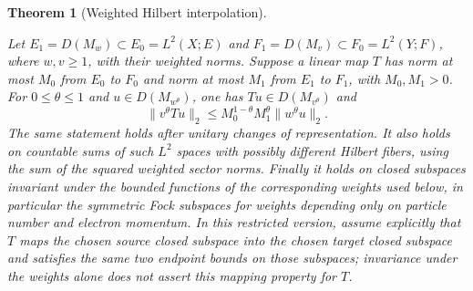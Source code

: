 \documentclass[11pt,a4paper]{article}
\newtheorem{theorem}{Theorem}[section]
\theoremstyle{definition}
\theoremstyle{remark}
\newcommand{\proofid}[1]{\par\smallskip{\normalfont\scriptsize\color{inkblue}Stable ID: \nolinkurl{#1}}\par\smallskip}
\begin{document}
\begin{theorem}[Weighted Hilbert interpolation]
\label{basic:interpolation}
\proofid{basic:interpolation}
\par{}\par\smallskip
\label{basic:weighted_interpolation}
Let $E_1=D(M_w)\subset E_0=L^2(X;E)$ and
$F_1=D(M_v)\subset F_0=L^2(Y;F)$, where $w,v\geq1$, with their weighted
norms. Suppose a linear map $T$ has norm at most $M_0$ from $E_0$ to
$F_0$ and norm at most $M_1$ from $E_1$ to $F_1$, with $M_0,M_1>0$.
For $0\leq\theta\leq1$ and $u\in D(M_{w^\theta})$, one has
$Tu\in D(M_{v^\theta})$ and
\[
 \|v^\theta Tu\|_2\leq M_0^{1-\theta}M_1^\theta\|w^\theta u\|_2.
\]
The same statement holds after unitary changes of representation.
It also holds on countable sums of such $L^2$ spaces with possibly
different Hilbert fibers, using the sum of the squared weighted sector
norms. Finally it holds on closed subspaces invariant under the bounded
functions of the corresponding weights used below, in particular the
symmetric Fock subspaces for weights depending only on particle number
and electron momentum. In this restricted version, assume explicitly
that $T$ maps the chosen source closed subspace into the chosen target
closed subspace and satisfies the same two endpoint bounds on those
subspaces; invariance under the weights alone does not assert this
mapping property for $T$.
\end{theorem}
\end{document}
